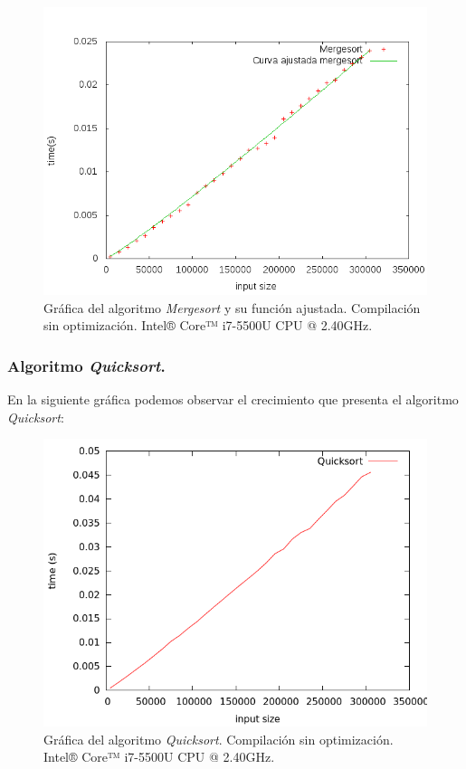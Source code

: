 \documentclass[11pt,a4paper]{article}
\begin{document}
				\begin{figure}[h]

					\centering
					\includegraphics[width=1\textwidth]{mergesort_ajustado.png}
					\caption{Gráfica del algoritmo \textit{Mergesort} y su función ajustada. Compilación sin optimización. Intel® Core™ i7-5500U CPU @ 2.40GHz.}

				\end{figure}

\newpage

			\subsubsection{Algoritmo \textit{Quicksort}.}

				\par
				En la siguiente gráfica podemos observar el crecimiento que presenta el algoritmo \textit{Quicksort}:

				\begin{figure}[h]

					\centering
					\includegraphics[width=1\textwidth]{quicksort.png}
					\caption{Gráfica del algoritmo \textit{Quicksort}. Compilación sin optimización. Intel® Core™ i7-5500U CPU @ 2.40GHz.}

				\end{figure}
\end{document}
